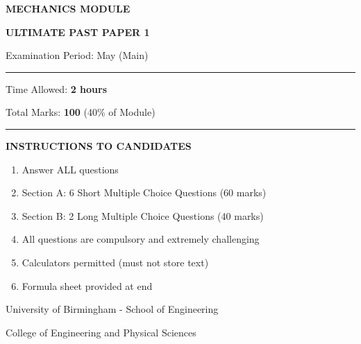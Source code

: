 \documentclass[12pt,a4paper]{article}
\begin{document}
\begin{titlepage}
    \centering
    \vspace*{2cm}
    {\Huge\bfseries\color{examblue}MECHANICS MODULE}\par
    \vspace{0.5cm}
    {\Large\bfseries ULTIMATE PAST PAPER 1}\par
    \vspace{1.5cm}
    {\large Examination Period: May (Main)}\par
    \vspace{0.5cm}
    \rule{\linewidth}{2pt}\par
    \vspace{1cm}
    {\Large Time Allowed: \textbf{2 hours}}\par
    \vspace{0.5cm}
    {\Large Total Marks: \textbf{100} (40\% of Module)}\par
    \vspace{1.5cm}
    \rule{\linewidth}{1pt}\par
    \vspace{1cm}
    {\large\bfseries INSTRUCTIONS TO CANDIDATES}\par
    \vspace{0.5cm}
    \begin{minipage}{0.8\linewidth}
        \begin{enumerate}[label=\textbf{\arabic*.},leftmargin=*]
            \item Answer ALL questions
            \item Section A: 6 Short Multiple Choice Questions (60 marks)
            \item Section B: 2 Long Multiple Choice Questions (40 marks)
            \item All questions are compulsory and extremely challenging
            \item Calculators permitted (must not store text)
            \item Formula sheet provided at end
        \end{enumerate}
    \end{minipage}
    \vfill
    {\small University of Birmingham - School of Engineering}\par
    \vspace{0.5cm}
    {\small College of Engineering and Physical Sciences}\par
\end{titlepage}

\newpage
\tableofcontents
\newpage
\end{document}
